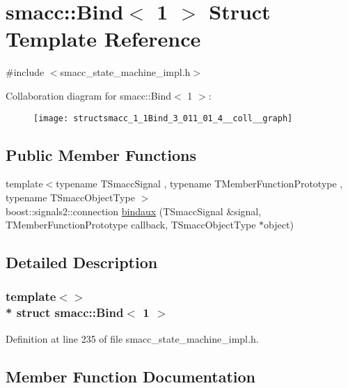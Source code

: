 \hypertarget{structsmacc_1_1Bind_3_011_01_4}{}\section{smacc\+:\+:Bind$<$ 1 $>$ Struct Template Reference}
\label{structsmacc_1_1Bind_3_011_01_4}


{\ttfamily \#include $<$smacc\+\_\+state\+\_\+machine\+\_\+impl.\+h$>$}



Collaboration diagram for smacc\+:\+:Bind$<$ 1 $>$\+:
\nopagebreak
\begin{figure}[H]
\begin{center}
\leavevmode
\texttt{[image: structsmacc\_1\_1Bind\_3\_011\_01\_4\_\_coll\_\_graph]}
\end{center}
\end{figure}
\subsection*{Public Member Functions}
\begin{DoxyCompactItemize}
\item 
{\footnotesize template$<$typename T\+Smacc\+Signal , typename T\+Member\+Function\+Prototype , typename T\+Smacc\+Object\+Type $>$ }\\boost\+::signals2\+::connection \hyperlink{structsmacc_1_1Bind_3_011_01_4_ab1ef45ad9d56f707284a5fcb166646ee}{bindaux} (T\+Smacc\+Signal \&signal, T\+Member\+Function\+Prototype callback, T\+Smacc\+Object\+Type $\ast$object)
\end{DoxyCompactItemize}


\subsection{Detailed Description}
\subsubsection*{template$<$$>$\\*
struct smacc\+::\+Bind$<$ 1 $>$}



Definition at line 235 of file smacc\+\_\+state\+\_\+machine\+\_\+impl.\+h.



\subsection{Member Function Documentation}
